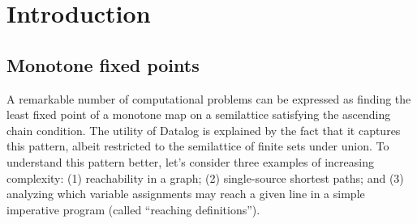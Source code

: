 \chapter{Introduction}


\section{Monotone fixed points}
\label{section-monotone-fixed-points}


A remarkable number of computational problems can be expressed as finding the
least fixed point of a monotone map on a semilattice satisfying the ascending
chain condition.
%
The utility of Datalog is explained by the fact that it captures this pattern,
albeit restricted to the semilattice of finite sets under union.
%
To understand this pattern better, let's consider three examples of increasing
complexity:
%
(1) reachability in a graph;
(2) single-source shortest paths;
and (3) analyzing which variable assignments may reach a given line in a simple
imperative program (called ``reaching definitions'').



